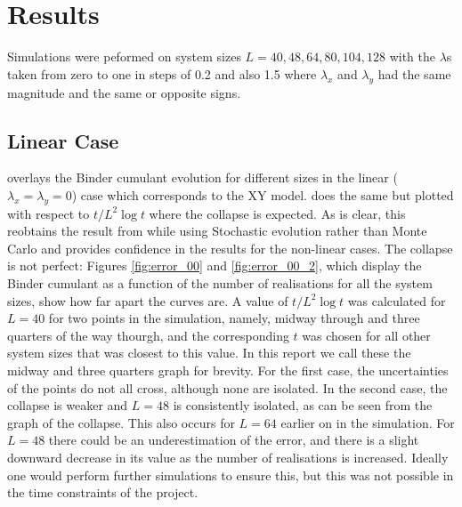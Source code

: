 \chapter{Results}

Simulations were peformed on system sizes $L=40, 48, 64, 80, 104, 128$ with the $\lambda$s taken from zero to one in steps of 0.2 and also 1.5 where $\lambda_x$ and $\lambda_y$ had the same magnitude and the same or opposite signs. 

\section{Linear Case}

\fig{\ref{fig:binder_t_00}} overlays the Binder cumulant evolution for different sizes in the linear ($\lambda_x = \lambda_y = 0$) case which corresponds to the XY model. \fig{\ref{fig:binder_logt_00}} does the same but plotted with respect to $t/L^2 \log t$ where the collapse is expected. 
As is clear, this reobtains the result from \cite{PhysRevLett.84.1503} while using Stochastic evolution rather than Monte Carlo and provides confidence in the results for the non-linear cases. 
The collapse is not perfect: Figures \ref{fig:error_00} and \ref{fig:error_00_2}, which display the Binder cumulant as a function of the number of realisations for all the system sizes, show how far apart the curves are. A value of $t /L^2 \log t$ was calculated for $L=40$ for two points in the simulation, namely, midway through and three quarters of the way thourgh, and the corresponding $t$ was chosen for all other system sizes that was closest to this value. In this report we call these the midway and three quarters graph for brevity. 
For the first case, the uncertainties of the points do not all cross, although none are isolated. 
In the second case, the collapse is weaker and $L=48$ is consistently isolated, as can be seen from the graph of the collapse. 
This also occurs for $L=64$ earlier on in the simulation. 
For $L=48$ there could be an underestimation of the error, and there is a slight downward decrease in its value as the number of realisations is increased. 
Ideally one would perform further simulations to ensure this, but this was not possible in the time constraints of the project. 

